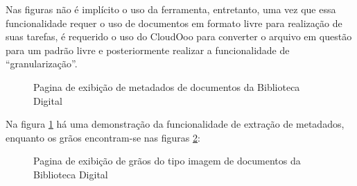 \newpage
Nas figuras não é implícito o uso da ferramenta, entretanto, uma vez que essa funcionalidade requer o uso de documentos em formato livre para realização de suas tarefas, é requerido o uso do CloudOoo para converter o arquivo em questão para um padrão livre e posteriormente realizar a funcionalidade de ``granularização''.

\begin{figure}[ht]
    \centering
    \caption{Pagina de exibição de metadados de documentos da Biblioteca Digital}
    \label{metadados}
\end{figure}

\newpage
Na figura \ref{metadados} há uma demonstração da funcionalidade de extração de metadados, enquanto os grãos encontram-se nas figuras \ref{imagens}:

\begin{figure}[ht]
    \centering
    \caption{Pagina de exibição de grãos do tipo imagem de documentos da Biblioteca Digital}
    \label{imagens}
\end{figure}

